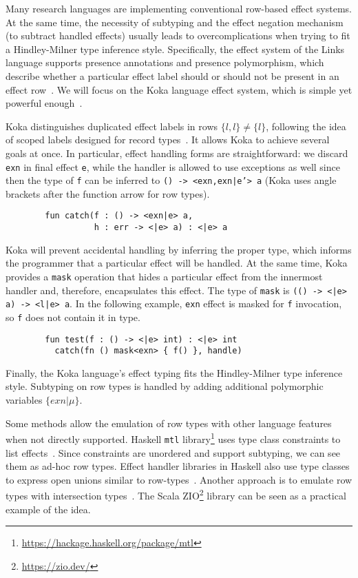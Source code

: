 \documentclass[conference]{IEEEtran}
\begin{document}
    Many research languages are implementing conventional row-based effect systems.
    At the same time, the necessity of subtyping and the effect negation mechanism (to subtract handled effects) usually leads to overcomplications when trying to fit a Hindley-Milner type inference style.
    Specifically, the effect system of the Links language supports presence annotations and presence polymorphism, which describe whether a particular effect label should or should not be present in an effect row~\cite{hillerstrom2016liberating}.
    We will focus on the Koka language effect system, which is simple yet powerful enough~\cite{leijen2014koka, leijen2017type}.

    Koka distinguishes duplicated effect labels in rows $\{l,l\}\neq \{l\}$, following the idea of scoped labels designed for record types~\cite{leijen2005extensible}.
    It allows Koka to achieve several goals at once.
    In particular, effect handling forms are straightforward: we discard \texttt{exn} in final effect \texttt{e}, while the handler is allowed to use exceptions as well since then the type of \texttt{f} can be inferred to \texttt{() -> <exn,exn|e'> a} (Koka uses angle brackets after the function arrow for row types).
    \begin{verbatim}
        fun catch(f : () -> <exn|e> a,
                  h : err -> <|e> a) : <|e> a
    \end{verbatim}

    Koka will prevent accidental handling by inferring the proper type, which informs the programmer that a particular effect will be handled.
    At the same time, Koka provides a \texttt{mask} operation that hides a particular effect from the innermost handler and, therefore, encapsulates this effect.
    The type of \texttt{mask} is \texttt{(() -> <|e> a) -> <l|e> a}.
    In the following example, \texttt{exn} effect is masked for \texttt{f} invocation, so \texttt{f} does not contain it in type.
    \begin{verbatim}
        fun test(f : () -> <|e> int) : <|e> int
          catch(fn () mask<exn> { f() }, handle)
    \end{verbatim}

    Finally, the Koka language's effect typing fits the Hindley-Milner type inference style.
    Subtyping on row types is handled by adding additional polymorphic variables $\{exn|\mu\}$.


    Some methods allow the emulation of row types with other language features when not directly supported.
    Haskell \texttt{mtl} library\footnote{\url{https://hackage.haskell.org/package/mtl}} uses type class constraints to list effects~\cite{jones1995functional}.
    Since constraints are unordered and support subtyping, we can see them as ad-hoc row types.
    Effect handler libraries in Haskell also use type classes to express open unions similar to row-types~\cite{swierstra2008data}.
    Another approach is to emulate row types with intersection types~\cite{xie2020row}.
    The Scala ZIO\footnote{\url{https://zio.dev/}} library can be seen as a practical example of the idea.
\end{document}
